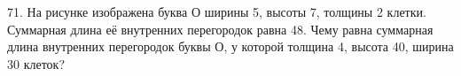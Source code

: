 71. На рисунке изображена буква О ширины 5, высоты 7, толщины 2 клетки. Суммарная длина её внутренних перегородок равна 48. Чему равна суммарная длина внутренних перегородок буквы О, у которой толщина 4, высота 40, ширина 30 клеток?
\begin{center}
\begin{figure}[ht!]
\end{figure}
\end{center}
